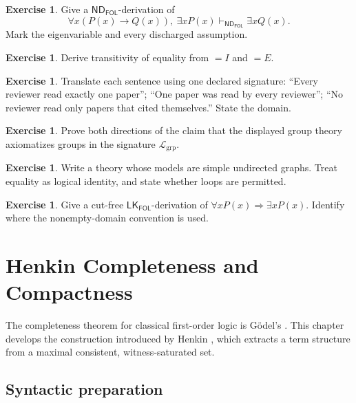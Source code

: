 \documentclass[11pt,oneside,openany]{book}
\theoremstyle{definition}
\newtheorem{exercise}[definition]{Exercise}
\theoremstyle{plain}
\theoremstyle{remark}
\newcommand{\Lang}{\mathcal{L}}
\newcommand{\derives}{\vdash}
\newcommand{\ND}{\mathsf{ND}}
\newcommand{\LK}{\mathsf{LK}}
\newcommand{\FOL}{\mathsf{FOL}}
\begin{document}
\begin{exercise}
\label{ex:fol-deduction-04}
Give a \(\ND_{\FOL}\)-derivation of
\[
 \forall x(P(x)\to Q(x)),\ \exists xP(x)
 \derives_{\ND_{\FOL}}\exists xQ(x).
\]
Mark the eigenvariable and every discharged assumption.
\end{exercise}

\begin{exercise}
\label{ex:fol-deduction-05}
Derive transitivity of equality from \(=I\) and \(=E\).
\end{exercise}

\begin{exercise}
\label{ex:fol-deduction-06}
Translate each sentence using one declared signature: ``Every reviewer read
exactly one paper''; ``One paper was read by every reviewer''; ``No reviewer
read only papers that cited themselves.''  State the domain.
\end{exercise}

\begin{exercise}
\label{ex:fol-deduction-07}
Prove both directions of the claim that the displayed group theory
axiomatizes groups in the signature \(\Lang_{\mathrm{grp}}\).
\end{exercise}

\begin{exercise}
\label{ex:fol-deduction-08}
Write a theory whose models are simple undirected graphs.  Treat equality as
logical identity, and state whether loops are permitted.
\end{exercise}

\begin{exercise}
\label{ex:fol-deduction-09}
Give a cut-free \(\LK_{\FOL}\)-derivation of
\(\forall xP(x)\Rightarrow\exists xP(x)\).  Identify where the nonempty-domain
convention is used.
\end{exercise}

\chapter{Henkin Completeness and Compactness}
\label{ch:fol-metatheory}

The completeness theorem for classical first-order logic is G\"odel's
\cite{Godel1930}.  This chapter develops the construction introduced by
Henkin \cite{Henkin1949}, which extracts a term structure from a maximal
consistent, witness-saturated set.

\section{Syntactic preparation}
\label{sec:fol-metatheory-01}
\end{document}
